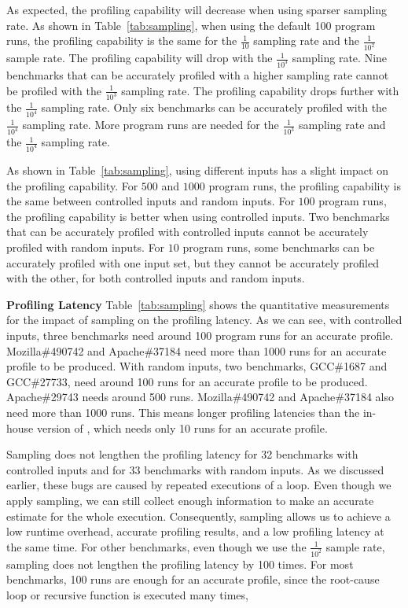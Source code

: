 As expected, the profiling capability will decrease when using sparser sampling rate. 
As shown in Table~\ref{tab:sampling}, 
when using the default 100 program runs,
the profiling capability is the same for the $\frac{1}{10}$ sampling rate 
and the $\frac{1}{10^2}$ sample rate.
The profiling capability will drop with the $\frac{1}{10^3}$ sampling rate. 
Nine benchmarks that can be accurately profiled with a higher sampling rate
cannot be profiled with the $\frac{1}{10^3}$ sampling rate.
The profiling capability drops further with the $\frac{1}{10^4}$ sampling rate. 
Only six benchmarks can be accurately profiled with the $\frac{1}{10^4}$ sampling rate. 
More program runs are needed for the $\frac{1}{10^3}$ sampling rate 
and the $\frac{1}{10^4}$ sampling rate. 

As shown in Table~\ref{tab:sampling}, 
using different inputs has a slight impact on the profiling capability. 
For $500$ and $1000$ program runs, 
the profiling capability is the same between controlled inputs and random inputs. 
For $100$ program runs, 
the profiling capability is better when using controlled inputs.
Two benchmarks that can be accurately profiled with controlled inputs 
cannot be accurately profiled with random inputs.
For $10$ program runs, 
some benchmarks can be accurately 
profiled with one input set, but they cannot 
be accurately profiled with the other, 
for both controlled inputs and random inputs.

\noindent\textbf{Profiling Latency}
Table~\ref{tab:sampling} shows the quantitative measurements for the impact of sampling on the profiling latency.
As we can see, with controlled inputs, 
three benchmarks need around 100 program runs for an accurate profile. 
Mozilla\#490742 and Apache\#37184 need more than 1000 runs for an accurate profile to be produced. 
With random inputs, two benchmarks, GCC\#1687 and GCC\#27733, 
need around 100 runs for an accurate profile to be produced. 
Apache\#29743 needs around 500 runs. 
Mozilla\#490742 and Apache\#37184 also need more than 1000 runs.   
This means longer profiling latencies than the in-house version of \Tool,
which needs only 10 runs for an accurate profile. 

Sampling does not lengthen the profiling latency for 32 benchmarks 
with controlled 
inputs and for 33 benchmarks with random inputs.
As we discussed earlier, these bugs are caused by repeated executions of a loop. 
Even though we apply sampling, 
we can still collect enough information to make an accurate estimate for the whole execution. 
Consequently, sampling allows us to achieve a low runtime overhead, 
accurate profiling results, and a low profiling latency at the same time. 
For other benchmarks, even though we use the $\frac{1}{10^2}$ sample rate, 
sampling does not lengthen the profiling latency by 100 times. 
For most benchmarks, 100 runs are enough for an accurate profile, 
since the root-cause loop or recursive function is executed many times, 


















